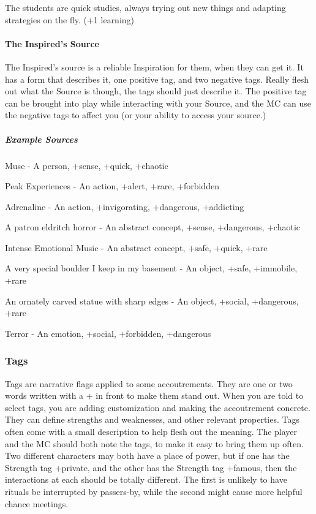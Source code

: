 \documentclass[
]{article}
\begin{document}
The students are quick studies, always trying out new things and
adapting strategies on the fly. (+1 learning)

\hypertarget{the-inspireds-source}{%
\paragraph{The Inspired's Source}\label{the-inspireds-source}}

The Inspired's source is a reliable Inspiration for them, when they can
get it. It has a form that describes it, one positive tag, and two
negative tags. Really flesh out what the Source is though, the tags
should just describe it. The positive tag can be brought into play while
interacting with your Source, and the MC can use the negative tags to
affect you (or your ability to access your source.)

\hypertarget{example-sources}{%
\subparagraph{Example Sources}\label{example-sources}}

Muse - A person, +sense, +quick, +chaotic

Peak Experiences - An action, +alert, +rare, +forbidden

Adrenaline - An action, +invigorating, +dangerous, +addicting

A patron eldritch horror - An abstract concept, +sense, +dangerous,
+chaotic

Intense Emotional Music - An abstract concept, +safe, +quick, +rare

A very special boulder I keep in my basement - An object, +safe,
+immobile, +rare

An ornately carved statue with sharp edges - An object, +social,
+dangerous, +rare

Terror - An emotion, +social, +forbidden, +dangerous

\hypertarget{tags}{%
\subsubsection{Tags}\label{tags}}

Tags are narrative flags applied to some accoutrements. They are one or
two words written with a + in front to make them stand out. When you are
told to select tags, you are adding customization and making the
accoutrement concrete. They can define strengths and weaknesses, and
other relevant properties. Tags often come with a small description to
help flesh out the meaning. The player and the MC should both note the
tags, to make it easy to bring them up often. Two different characters
may both have a place of power, but if one has the Strength tag
+private, and the other has the Strength tag +famous, then the
interactions at each should be totally different. The first is unlikely
to have rituals be interrupted by passers-by, while the second might
cause more helpful chance meetings.
\end{document}
